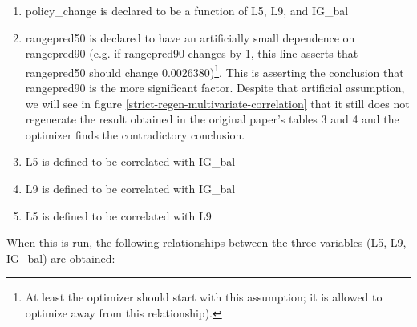 \documentclass[]{article}
\begin{document}
\begin{enumerate}
	This "net interest group alignment" is then normalized between 0 and 1 to yield IG\_bal:
	\[ \text{IG\_bal} = \text{normalize}(\text{net interest group alignment}) \]
	\item policy\_change is declared to be a function of L5, L9, and IG\_bal
	\item rangepred50 is declared to have an artificially small dependence on rangepred90 (e.g. if rangepred90 changes by 1, this line asserts that rangepred50 should change 0.0026380)\footnote{At least the optimizer should start with this assumption; it is allowed to optimize away from this relationship).}. This is asserting the conclusion that rangepred90 is the more significant factor. Despite that artificial assumption, we will see in figure \ref{strict-regen-multivariate-correlation} that it still does not regenerate the result obtained in the original paper's tables 3 and 4 and the optimizer finds the contradictory conclusion.
	\item L5 is defined to be correlated with IG\_bal
	\item L9 is defined to be correlated with IG\_bal
	\item L5 is defined to be correlated with L9
\end{enumerate}
When this is run, the following relationships between the three variables (L5, L9, IG\_bal) are obtained:
\end{document}
